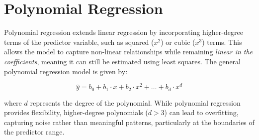 \documentclass[
]{book}
\theoremstyle{definition}
\theoremstyle{definition}
\theoremstyle{definition}
\theoremstyle{definition}
\theoremstyle{remark}
\begin{document}
\section{Polynomial Regression}\label{polynomial-regression}

Polynomial regression extends linear regression by incorporating higher-degree terms of the predictor variable, such as squared (\(x^2\)) or cubic (\(x^3\)) terms. This allows the model to capture non-linear relationships while remaining \emph{linear in the coefficients}, meaning it can still be estimated using least squares. The general polynomial regression model is given by:

\[
\hat{y} = b_0 + b_1 \cdot x + b_2 \cdot x^2 + \dots + b_d \cdot x^d
\]

where \(d\) represents the degree of the polynomial. While polynomial regression provides flexibility, higher-degree polynomials (\(d > 3\)) can lead to overfitting, capturing noise rather than meaningful patterns, particularly at the boundaries of the predictor range.
\end{document}
